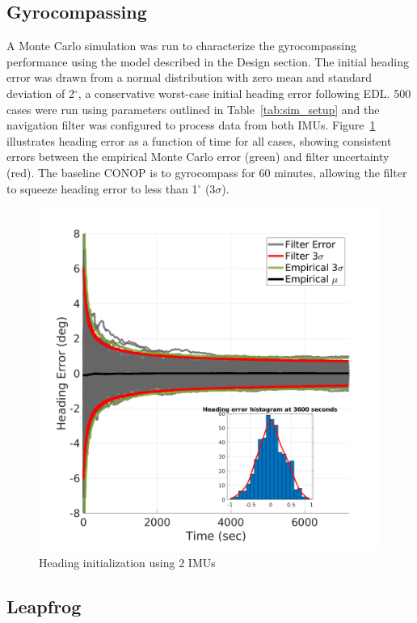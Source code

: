 \subsection{Gyrocompassing}

A Monte Carlo simulation was run to characterize the gyrocompassing performance using the model described in the Design section. The initial heading error was drawn from a normal distribution with zero mean and standard deviation of 2$^\circ$, a conservative worst-case initial heading error following \ac{EDL}. 500 cases were run using parameters outlined in Table~\ref{tab:sim_setup} and the navigation filter was configured to process data from both \acp{IMU}. Figure~\ref{fig:gyrocompassing} illustrates heading error as a function of time for all cases, showing consistent errors between the empirical Monte Carlo error (green) and filter uncertainty (red). The baseline CONOP is to gyrocompass for 60 minutes, allowing the filter to squeeze heading error to less than 1$^\circ$ (3$\sigma$). 

\begin{figure}[htbp]
	\centering\includegraphics[width=4.5in]{content/figures/gc/dual/HeadingErrorTOF.png}
	\caption{Heading initialization using 2 IMUs}
	\label{fig:gyrocompassing}
\end{figure}

\subsection{Leapfrog}

